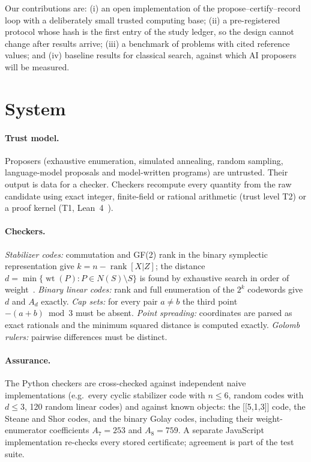 \documentclass[11pt]{article}
\begin{document}
Our contributions are: (i) an open implementation of the propose--certify--record loop
with a deliberately small trusted computing base; (ii) a pre-registered protocol whose
hash is the first entry of the study ledger, so the design cannot change after results
arrive; (iii) a benchmark of \NumProblems{} problems with cited reference values; and
(iv) baseline results for classical search, against which AI proposers will be measured.

\section{System}
\paragraph{Trust model.} Proposers (exhaustive enumeration, simulated annealing, random
sampling, language-model proposals and model-written programs) are untrusted. Their
output is data for a checker. Checkers recompute every quantity from the raw candidate
using exact integer, finite-field or rational arithmetic (trust level T2) or a proof
kernel (T1, Lean~4~\citep{lean4}).

\paragraph{Checkers.} \emph{Stabilizer codes:} commutation and GF(2) rank in the binary
symplectic representation give $k = n - \operatorname{rank}[X|Z]$; the distance
$d = \min\{\operatorname{wt}(P) : P \in N(S)\setminus S\}$ is found by exhaustive search in
order of weight~\citep{gottesman1997,crss1998}. \emph{Binary linear codes:} rank and full
enumeration of the $2^k$ codewords give $d$ and $A_d$ exactly. \emph{Cap sets:} for every
pair $a \ne b$ the third point $-(a+b) \bmod 3$ must be absent. \emph{Point spreading:}
coordinates are parsed as exact rationals and the minimum squared distance is computed
exactly. \emph{Golomb rulers:} pairwise differences must be distinct.

\paragraph{Assurance.} The Python checkers are cross-checked against independent naive
implementations (e.g.\ every cyclic stabilizer code with $n \le 6$, random codes with
$d \le 3$, 120 random linear codes) and against known objects: the [[5,1,3]] code, the
Steane and Shor codes, and the binary Golay codes, including their weight-enumerator
coefficients $A_7 = 253$ and $A_8 = 759$. A separate JavaScript implementation re-checks
every stored certificate; agreement is part of the test suite.
\end{document}
